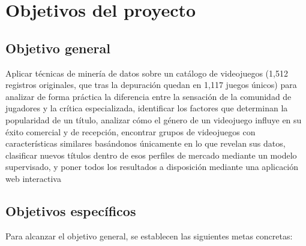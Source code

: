 \documentclass[letterpaper,11pt]{article}
\begin{document}


\newpage
{%
  \makeatletter
  \let\ps@plain\ps@indice
  \makeatother
  \pagestyle{indice}
  \thispagestyle{indice}
  \hypersetup{linkcolor=black}\tableofcontents
  \thispagestyle{indice}
}

\newpage

\setcounter{page}{1}
\singlespacing

\section{Objetivos del proyecto}

\subsection{Objetivo general}

Aplicar técnicas de minería de datos sobre un catálogo de videojuegos (1,512 registros originales, que tras la depuración quedan en 1,117 juegos únicos) para analizar de forma práctica la diferencia entre la sensación de la comunidad de jugadores y la crítica especializada, identificar los factores que determinan la popularidad de un título, analizar cómo el género de un videojuego influye en su éxito comercial y de recepción, encontrar grupos de videojuegos con características similares basándonos únicamente en lo que revelan sus datos, clasificar nuevos títulos dentro de esos perfiles de mercado mediante un modelo supervisado, y poner todos los resultados a disposición mediante una aplicación web interactiva

\subsection{Objetivos específicos}

Para alcanzar el objetivo general, se establecen las siguientes metas concretas:
\end{document}
